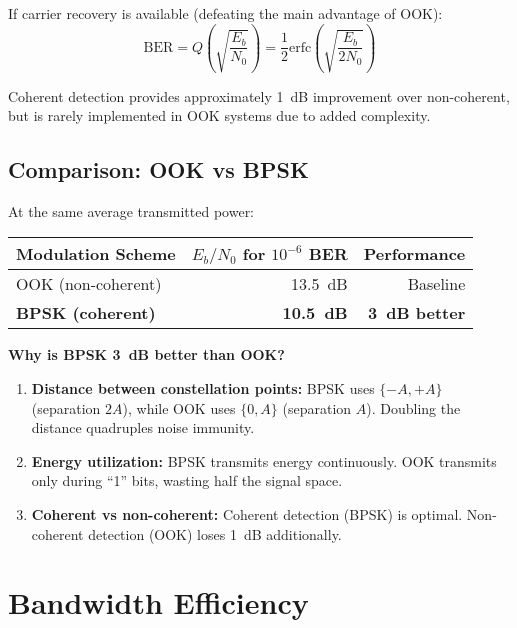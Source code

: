 If carrier recovery is available (defeating the main advantage of OOK):
\begin{equation}
\mathrm{BER} = Q\left(\sqrt{\frac{E_b}{N_0}}\right) = \frac{1}{2}\mathrm{erfc}\left(\sqrt{\frac{E_b}{2N_0}}\right)
\end{equation}

Coherent detection provides approximately 1~dB improvement over non-coherent, but is rarely implemented in OOK systems due to added complexity.

\subsection{Comparison: OOK vs BPSK}

At the same average transmitted power:

\begin{center}
\begin{tabular}{@{}lrr@{}}
\toprule
Modulation Scheme & $E_b/N_0$ for $10^{-6}$ BER & Performance \\
\midrule
OOK (non-coherent) & 13.5~dB & Baseline \\
\textbf{BPSK (coherent)} & \textbf{10.5~dB} & \textbf{3~dB better} \\
\bottomrule
\end{tabular}
\end{center}

\begin{keyconcept}
\textbf{Why is BPSK 3~dB better than OOK?}

\begin{enumerate}
\item \textbf{Distance between constellation points:} BPSK uses $\{-A, +A\}$ (separation $2A$), while OOK uses $\{0, A\}$ (separation $A$). Doubling the distance quadruples noise immunity.

\item \textbf{Energy utilization:} BPSK transmits energy continuously. OOK transmits only during ``1'' bits, wasting half the signal space.

\item \textbf{Coherent vs non-coherent:} Coherent detection (BPSK) is optimal. Non-coherent detection (OOK) loses 1~dB additionally.
\end{enumerate}
\end{keyconcept}

\section{Bandwidth Efficiency}

